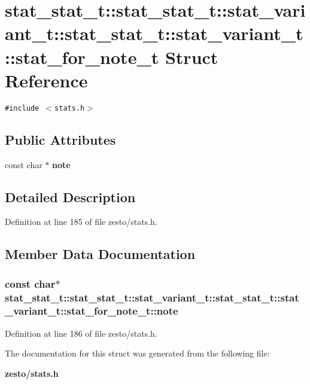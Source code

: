 \section{stat\_\-stat\_\-t::stat\_\-stat\_\-t::stat\_\-variant\_\-t::stat\_\-stat\_\-t::stat\_\-variant\_\-t::stat\_\-for\_\-note\_\-t Struct Reference}
\label{structstat__stat__t_1_1stat__variant__t_1_1stat__for__note__t}
{\tt \#include $<$stats.h$>$}

\subsection*{Public Attributes}
\begin{CompactItemize}
\item 
const char $\ast$ {\bf note}
\end{CompactItemize}


\subsection{Detailed Description}


Definition at line 185 of file zesto/stats.h.

\subsection{Member Data Documentation}
\subsubsection[{note}]{\setlength{\rightskip}{0pt plus 5cm}const char$\ast$ stat\_\-stat\_\-t::stat\_\-stat\_\-t::stat\_\-variant\_\-t::stat\_\-stat\_\-t::stat\_\-variant\_\-t::stat\_\-for\_\-note\_\-t::note}\label{structstat__stat__t_1_1stat__variant__t_1_1stat__for__note__t_ba8beddca224294780886fbb0828ebe3}




Definition at line 186 of file zesto/stats.h.

The documentation for this struct was generated from the following file:\begin{CompactItemize}
\item 
{\bf zesto/stats.h}\end{CompactItemize}
